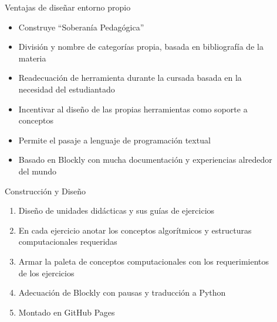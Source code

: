 \documentclass[final]{beamer}
\newlength{\sepwid}
\newlength{\twocolwid}
\begin{document}
\begin{frame}[t]
\begin{columns}[t]
\begin{column}{\sepwid}\end{column} %

\begin{column}{\sepwid}\end{column} %

\begin{column}{\twocolwid} %


\begin{block}{Ventajas de diseñar entorno propio}
\begin{itemize}
    \item Construye ``Soberanía Pedagógica''
    \item División y nombre de categorías propia, basada en bibliografía de la materia
    \item Readecuación de herramienta durante la cursada basada en la necesidad del estudiantado
    \item Incentivar al diseño de las propias herramientas como soporte a conceptos
    \item Permite el pasaje a lenguaje de programación textual
    \item Basado en Blockly\cite{blockly} con mucha documentación y experiencias alrededor del mundo
\end{itemize}


\end{block}

\begin{block}{Construcción y Diseño}
    \begin{enumerate}
        \item Diseño de unidades didácticas y sus guías de ejercicios
        \item En cada ejercicio anotar los conceptos algorítmicos y estructuras computacionales requeridas
        \item Armar la paleta de conceptos computacionales con los requerimientos de los ejercicios
        \item Adecuación de Blockly\cite{blockly} con pausas y traducción a Python 
        \item Montado en GitHub Pages

    \end{enumerate}

\end{block}



\end{column}
\end{columns}
\end{frame}
\end{document}
